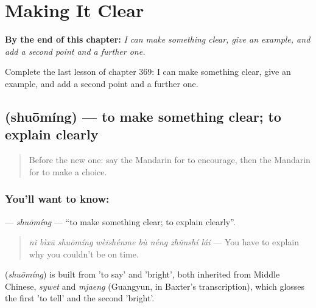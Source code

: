 
\chapter{Making It Clear}
\label{ch:zh-making-it-clear}

\begin{chapteropening}
\textbf{By the end of this chapter:} \emph{I can make something clear, give an example, and add a second point and a further one.}

Complete the last lesson of chapter 369: I can make something clear, give an example, and add a second point and a further one.
\end{chapteropening}

\section[\texorpdfstring{\zh{说明} (shuōmíng)}{说明 (shuōmíng)}]{ (shuōmíng) — to make something clear; to explain clearly}

\label{lesson:ZH-C369-shuoming}



\begin{quote}
Before the new one: say the Mandarin for to encourage, then the Mandarin for to make a choice.
\end{quote}

\subsection*{You'll want to know: }
\textbf{} — \emph{shuōmíng} — \textquotedblleft{}to make something clear; to explain clearly\textquotedblright{}.

\begin{quote}
\textbf{} \emph{nǐ bìxū shuōmíng wèishénme bù néng zhǔnshí lái} — You have to explain why you couldn't be on time.
\end{quote}

\begin{cousinweb}
\textbf{} (\emph{shuōmíng}) is built from  'to say' and  'bright', both inherited from Middle Chinese, \emph{sywet} and \emph{mjaeng} (Guangyun, in Baxter's transcription), which glosses the first 'to tell' and the second 'bright'.
\end{cousinweb}

